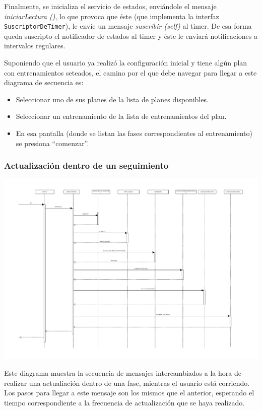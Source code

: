 Finalmente, se inicializa el servicio de estados, enviándole el mensaje \emph{iniciarLectura ()}, lo que provoca que éste (que implementa la interfaz \texttt{SuscriptorDeTimer}), le envíe un mensaje \emph{suscribir (self)} al timer. De esa forma queda suscripto el notificador de estados al timer y éste le enviará notificaciones a intervalos regulares.


Suponiendo que el usuario ya realizó la configuración inicial y tiene algún plan con entrenamientos seteados, el camino por el que debe navegar para llegar a este diagrama de secuencia es:
\begin{itemize}
	\item Seleccionar uno de sus planes de la lista de planes disponibles.
	\item Seleccionar un entrenamiento de la lista de entrenamientos del plan.
	\item En esa pantalla (donde se listan las fases correspondientes al entrenamiento) se presiona ``comenzar''.
\end{itemize}

\subsubsection{Actualización dentro de un seguimiento} \label{unaSeccion}
\begin{center}
	\includegraphics[scale=0.5]{images/ActualizacionSeguimiento.pdf}
\end{center}

Este diagrama muestra la secuencia de mensajes intercambiados a la hora de realizar una actualiación dentro de una fase, mientras el usuario está corriendo. Los pasos para llegar a este mensaje son los mismos que el anterior, esperando el tiempo correspondiente a la frecuencia de actualización que se haya realizado.


